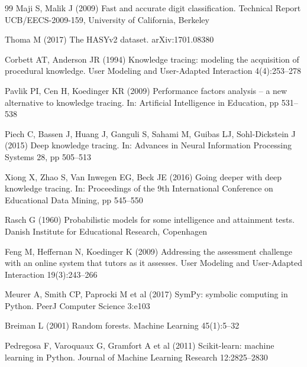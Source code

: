\documentclass[runningheads]{llncs}
\begin{document}
\begin{thebibliography}{99}
Maji S, Malik J (2009) Fast and accurate digit classification. Technical Report UCB/EECS-2009-159, University of California, Berkeley

Thoma M (2017) The HASYv2 dataset. arXiv:1701.08380

Corbett AT, Anderson JR (1994) Knowledge tracing: modeling the acquisition of procedural knowledge. User Modeling and User-Adapted Interaction 4(4):253--278

Pavlik PI, Cen H, Koedinger KR (2009) Performance factors analysis -- a new alternative to knowledge tracing. In: Artificial Intelligence in Education, pp 531--538

Piech C, Bassen J, Huang J, Ganguli S, Sahami M, Guibas LJ, Sohl-Dickstein J (2015) Deep knowledge tracing. In: Advances in Neural Information Processing Systems 28, pp 505--513

Xiong X, Zhao S, Van Inwegen EG, Beck JE (2016) Going deeper with deep knowledge tracing. In: Proceedings of the 9th International Conference on Educational Data Mining, pp 545--550

Rasch G (1960) Probabilistic models for some intelligence and attainment tests. Danish Institute for Educational Research, Copenhagen

Feng M, Heffernan N, Koedinger K (2009) Addressing the assessment challenge with an online system that tutors as it assesses. User Modeling and User-Adapted Interaction 19(3):243--266

Meurer A, Smith CP, Paprocki M et al (2017) SymPy: symbolic computing in Python. PeerJ Computer Science 3:e103

Breiman L (2001) Random forests. Machine Learning 45(1):5--32

Pedregosa F, Varoquaux G, Gramfort A et al (2011) Scikit-learn: machine learning in Python. Journal of Machine Learning Research 12:2825--2830

\end{thebibliography}
\end{document}
